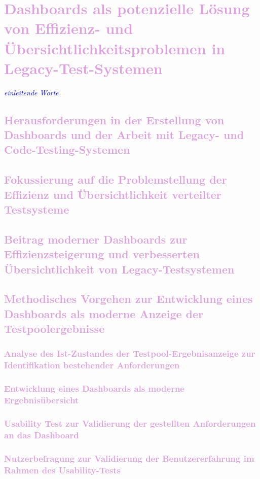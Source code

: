 \chapter{\textcolor{Plum}{Dashboards als potenzielle Lösung von Effizienz- und Übersichtlichkeitsproblemen in Legacy-Test-Systemen}}
\label{ch:Problemstellung}
\textcolor{blue}{\textit{einleitende Worte}}

\section{\textcolor{Plum}{Herausforderungen in der Erstellung von Dashboards und der
Arbeit mit Legacy- und Code-Testing-Systemen}}

\section{\textcolor{Plum}{Fokussierung auf die Problemstellung der Effizienz und Übersichtlichkeit verteilter Testsysteme}}

\section{\textcolor{Plum}{Beitrag moderner Dashboards zur Effizienzsteigerung und verbesserten Übersichtlichkeit von Legacy-Testsystemen}}

\section{\textcolor{Plum}{Methodisches Vorgehen zur Entwicklung eines Dashboards als
moderne Anzeige der Testpoolergebnisse}}

\subsection{\textcolor{Plum}{Analyse des Ist-Zustandes der Testpool-Ergebnisanzeige zur Identifikation bestehender Anforderungen}}

\subsection{\textcolor{Plum}{Entwicklung eines Dashboards als moderne Ergebnisübersicht}}

\subsection{\textcolor{Plum}{Usability Test zur Validierung der gestellten Anforderungen an das Dashboard}}

\subsection{\textcolor{Plum}{Nutzerbefragung zur Validierung der Benutzererfahrung im
Rahmen des Usability-Tests}}

